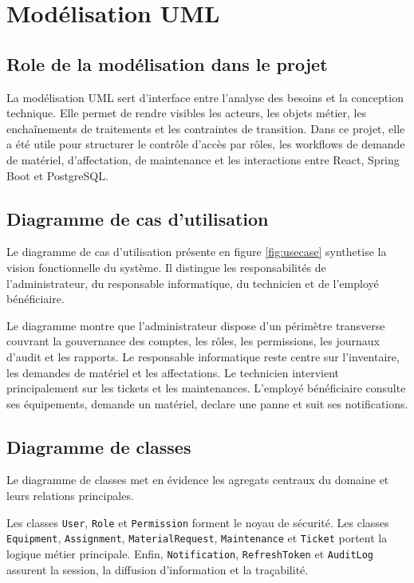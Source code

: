 ﻿\chapter{Modélisation UML}
\label{chap:uml}

\section{Role de la modélisation dans le projet}
La modélisation UML sert d'interface entre l'analyse des besoins et la conception technique. Elle permet de rendre visibles les acteurs, les objets métier, les enchaînements de traitements et les contraintes de transition. Dans ce projet, elle a été utile pour structurer le contrôle d'accès par rôles, les workflows de demande de matériel, d'affectation, de maintenance et les interactions entre React, Spring Boot et PostgreSQL.

\section{Diagramme de cas d'utilisation}
Le diagramme de cas d'utilisation présente en figure \ref{fig:usecase} synthetise la vision fonctionnelle du système. Il distingue les responsabilités de l'administrateur, du responsable informatique, du technicien et de l'employé bénéficiaire.


Le diagramme montre que l'administrateur dispose d'un périmètre transverse couvrant la gouvernance des comptes, les rôles, les permissions, les journaux d'audit et les rapports. Le responsable informatique reste centre sur l'inventaire, les demandes de matériel et les affectations. Le technicien intervient principalement sur les tickets et les maintenances. L'employé bénéficiaire consulte ses équipements, demande un matériel, declare une panne et suit ses notifications.

\section{Diagramme de classes}
Le diagramme de classes met en évidence les agregats centraux du domaine et leurs relations principales.


Les classes \texttt{User}, \texttt{Role} et \texttt{Permission} forment le noyau de sécurité. Les classes \texttt{Equipment}, \texttt{Assignment}, \texttt{MaterialRequest}, \texttt{Maintenance} et \texttt{Ticket} portent la logique métier principale. Enfin, \texttt{Notification}, \texttt{RefreshToken} et \texttt{AuditLog} assurent la session, la diffusion d'information et la traçabilité.

